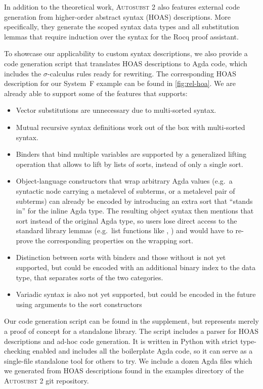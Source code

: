 \documentclass[a4paper,UKenglish,cleveref, autoref, thm-restate,anonymous]{lipics-v2021}
\begin{document}
In addition to the theoretical work, \textsc{Autosubst 2} also features
external code generation from higher-order abstract syntax (HOAS) descriptions.
More specifically, they generate the scoped syntax data types and all
substitution lemmas that require induction over the syntax for the Rocq proof
assistant.

To showcase our applicability to custom syntax descriptions, we also provide a
code generation script that translates HOAS descriptions to Agda code, which
includes the $σ$-calculus rules ready for rewriting. The corresponding HOAS
description for our System~F example can be found in \cref{fig:rel-hoa}. We are
already able to support some of the features that  supports:
\begin{itemize}
      \item Vector substitutions are unnecessary due to multi-sorted syntax.
      \item Mutual recursive syntax definitions work out of the box with multi-sorted
            syntax.
      \item Binders that bind multiple variables are supported by a generalized lifting
            operation that allows to lift by lists of sorts, instead of only a single sort.
      \item Object-language constructors that wrap arbitrary Agda values (e.g.\
            a syntactic node carrying a metalevel  of subterms,
            or a metalevel pair of subterms) can already be encoded by introducing
            an extra sort that ``stands in'' for the inline Agda type. The resulting
            object syntax then mentions that sort instead of the original Agda type,
            so users lose direct access to the standard library lemmas (e.g.\ list
            functions like \AgdaFunction{map}, \AgdaFunction{++}) and would have to
            re-prove the corresponding properties on the wrapping sort.
      \item Distinction between sorts with binders and those without is not yet supported,
            but could be encoded with an additional binary index to the \AgdaDatatype{Sort}
            data type, that separates sorts of the two categories.
      \item Variadic syntax is also not yet supported, but could be encoded in the future
            using arguments to the sort constructors~\cite{saffrich:LIPIcs.ITP.2024.32}
\end{itemize}

Our code generation script can be found in the supplement, but represents
merely a proof of concept for a standalone library. The script includes a
parser for HOAS descriptions and ad-hoc code generation. It is written in
Python with strict type-checking enabled and includes all the boilerplate Agda
code, so it can serve as a single-file standalone tool for others to try. We
include a dozen Agda files which we generated from HOAS descriptions found in
the examples directory of the \textsc{Autosubst 2} git repository.
\end{document}
